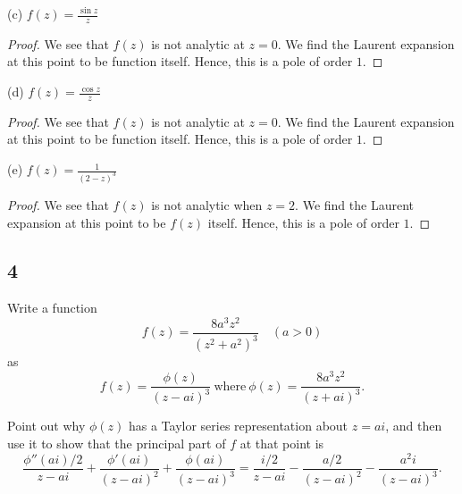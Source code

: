 \documentclass{article}
\begin{document}
(c) $f(z) = \frac{\sin z}{z}$
\begin{proof}
    We see that $f(z)$ is not analytic at $z = 0$. We find the Laurent expansion
    at this point to be function itself. Hence, this is a pole of order $1$.
\end{proof}

(d) $f(z) = \frac{\cos z}{z}$
\begin{proof}
    We see that $f(z)$ is not analytic at $z = 0$. We find the Laurent expansion
    at this point to be function itself. Hence, this is a pole of order $1$.
\end{proof}

(e) $f(z) = \frac{1}{(2-z)^3}$
\begin{proof}
    We see that $f(z)$ is not analytic when $z = 2$. We find the Laurent expansion
    at this point to be $f(z)$ itself. Hence, this is a pole of order $1$.
\end{proof}

\subsection*{4}
Write a function
\[f(z) = \frac{8a^3z^2}{(z^2 + a^2)^3} \quad (a > 0)\]
as
\[f(z) = \frac{\phi(z)}{(z-ai)^3} \ \text{where} \ \phi(z) = \frac{8a^3z^2}{(z+ai)^3}.\]

Point out why $\phi(z)$ has a Taylor series representation about $z = ai$, and then
use it to show that the principal part of $f$ at that point is
\[\frac{\phi''(ai)/2}{z - ai} + \frac{\phi'(ai)}{(z-ai)^2} + \frac{\phi(ai)}{(z-ai)^3}
    = \frac{i/2}{z - ai} - \frac{a/2}{(z-ai)^2} - \frac{a^2i}{(z-ai)^3}.\]
\end{document}
